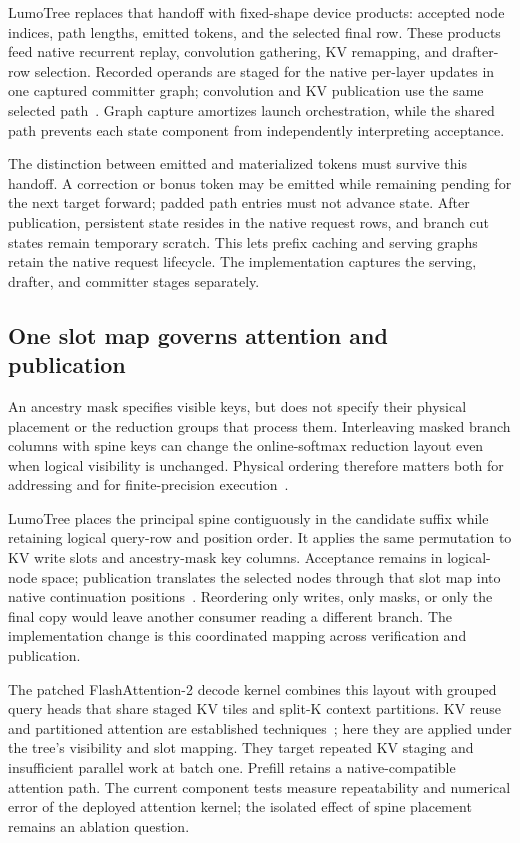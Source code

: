 \documentclass[conference]{IEEEtran}
\newcommand{\sys}{LumoTree}
\begin{document}
\sys{} replaces that handoff with fixed-shape device products: accepted node indices, path lengths, emitted tokens, and the selected final row. These products feed native recurrent replay, convolution gathering, KV remapping, and drafter-row selection. Recorded operands are staged for the native per-layer updates in one captured committer graph; convolution and KV publication use the same selected path~\cite{lumo2026archive}. Graph capture amortizes launch orchestration, while the shared path prevents each state component from independently interpreting acceptance.

The distinction between emitted and materialized tokens must survive this handoff. A correction or bonus token may be emitted while remaining pending for the next target forward; padded path entries must not advance state. After publication, persistent state resides in the native request rows, and branch cut states remain temporary scratch. This lets prefix caching and serving graphs retain the native request lifecycle. The implementation captures the serving, drafter, and committer stages separately.

\subsection{One slot map governs attention and publication}
\label{sec:reconstruction-numerics}
An ancestry mask specifies visible keys, but does not specify their physical placement or the reduction groups that process them. Interleaving masked branch columns with spine keys can change the online-softmax reduction layout even when logical visibility is unchanged. Physical ordering therefore matters both for addressing and for finite-precision execution~\cite{he2025determinism}.

\sys{} places the principal spine contiguously in the candidate suffix while retaining logical query-row and position order. It applies the same permutation to KV write slots and ancestry-mask key columns. Acceptance remains in logical-node space; publication translates the selected nodes through that slot map into native continuation positions~\cite{lumo2026archive}. Reordering only writes, only masks, or only the final copy would leave another consumer reading a different branch. The implementation change is this coordinated mapping across verification and publication.

The patched FlashAttention-2 decode kernel combines this layout with grouped query heads that share staged KV tiles and split-K context partitions. KV reuse and partitioned attention are established techniques~\cite{yao2024deft,pan2025fasttree}; here they are applied under the tree's visibility and slot mapping. They target repeated KV staging and insufficient parallel work at batch one. Prefill retains a native-compatible attention path. The current component tests measure repeatability and numerical error of the deployed attention kernel; the isolated effect of spine placement remains an ablation question.
\end{document}
